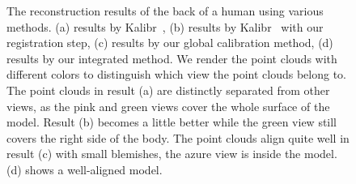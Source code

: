 \begin{figure}[htbp]
{\begin{minipage}[c]{.22\linewidth}
\end{minipage}
}
\caption{The reconstruction results of the back of a human using various methods. (a) results by Kalibr~\cite{Maye2013Self}, (b) results by Kalibr~\cite{Maye2013Self} with our registration step, (c) results by our global calibration method, (d) results by our integrated method. We render the point clouds with different colors to distinguish which view the point clouds belong to. The point clouds in result (a) are distinctly separated from other views, as the pink and green views cover the whole surface of the model. Result (b) becomes a little better while the green view still covers the right side of the body. The point clouds align quite well in result (c) with small blemishes, the azure view is inside the model. (d) shows a well-aligned model. }
\label{fig:pointcloud}
\end{figure}


